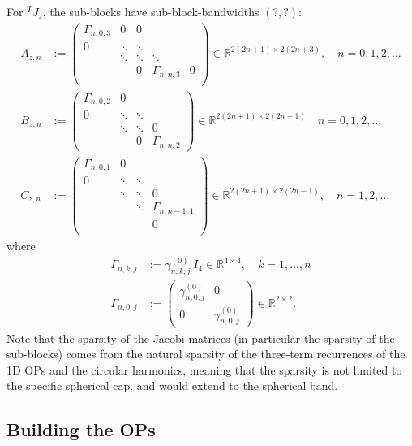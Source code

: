 \documentclass[11pt, oneside]{article}   	%
\newcommand{\R}{\mathbb{R}}
\newcommand{\jacobimattangent}{{}^T\!J}
\newcommand{\jacobimattangentz}{\jacobimattangent_z}
\newcommand{\gammao}{\gamma^{(0)}}
\newcommand{\gammaonkj}{\gammao_{n,k,j}}
\begin{document}
For $\jacobimattangentz$, the sub-blocks have sub-block-bandwidths $(?,?)$:
\begin{align*}
	A_{z,n} &:= 
		\begin{pmatrix}
			\Gamma_{n,0,3} & 0 & 0 & & \\
			0 & \ddots & \ddots & & \\
			& \ddots & \ddots & \ddots & \\
			& & 0 & \Gamma_{n,n,3} & 0 \\
		\end{pmatrix} \in \R^{2(2n+1)\times2(2n+3)}, \quad n = 0,1,2,\dots \\
	B_{z,n} &:= 
		\begin{pmatrix}
			\Gamma_{n,0,2} & 0 & & \\
			0 & \ddots & \ddots & \\
			& \ddots & \ddots & 0 \\
			& & 0 & \Gamma_{n,n,2}
		\end{pmatrix} \in \R^{2(2n+1)\times2(2n+1)}  \quad n = 0,1,2,\dots \\
	C_{z,n} &:= 
		\begin{pmatrix}
			\Gamma_{n,0,1} & 0 & & \\
			0 & \ddots & \ddots & \\
			& \ddots & \ddots & 0 \\
			& & \ddots &  \Gamma_{n,n-1,1} \\
			& & & 0 \\
		\end{pmatrix} \in \R^{2(2n+1)\times2(2n-1)}, \quad n = 1,2,\dots
\end{align*}
where
\begin{align*}
	\Gamma_{n,k,j} &:= \gammaonkj \: I_{4} \in \R^{4\times4}, \quad k = 1,\dots,n \\
	\Gamma_{n,0,j} &:=
		\begin{pmatrix}
			\gammao_{n,0,j} & 0 \\
			0 & \gammao_{n,0,j}
		\end{pmatrix} \in \R^{2\times2}.
\end{align*}
Note that the sparsity of the Jacobi matrices (in particular the sparsity of the sub-blocks) comes from the natural sparsity of the three-term recurrences of the 1D OPs and the circular harmonics, meaning that the sparsity is not limited to the specific spherical cap, and would extend to the spherical band.


\subsection{Building the OPs} 
\end{document}
